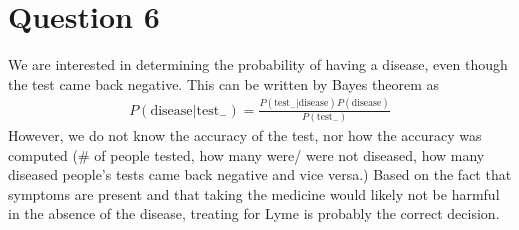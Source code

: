 \documentclass{article}[12 pt]
\begin{document}
\section*{Question 6}
We are interested in determining the probability of having a disease, even though the test came back negative.  This can be written by Bayes theorem as 
\begin{align*}
	P(\text{disease}|\text{test}_{-}) = \frac{P(\text{test}_{- }|\text{disease})P(\text{disease})}{P(\text{test}_{-})}
\end{align*}
\noindent
However, we do not know the accuracy of the test, nor how the accuracy was computed (\# of people tested, how many were/ were not diseased, how many diseased people's tests came back negative and vice versa.)  Based on the fact that symptoms are present and that taking the medicine would likely not be harmful in the absence of the disease, treating for Lyme is probably the correct decision.
\end{document}
